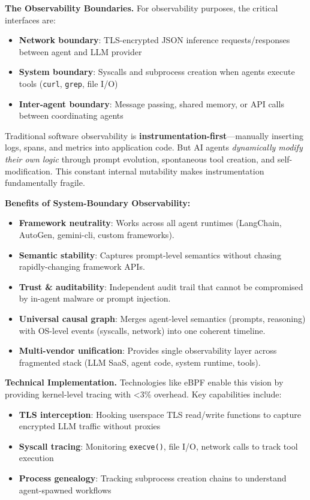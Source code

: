\documentclass[sigplan,screen，review,9pt]{acmart}
\begin{document}
\textbf{The Observability Boundaries.} For observability purposes, the critical interfaces are:
\begin{itemize}
  \item \textbf{Network boundary}: TLS-encrypted JSON inference requests/responses between agent and LLM provider
  \item \textbf{System boundary}: Syscalls and subprocess creation when agents execute tools (\texttt{curl}, \texttt{grep}, file I/O)
  \item \textbf{Inter-agent boundary}: Message passing, shared memory, or API calls between coordinating agents
\end{itemize}

Traditional software observability is \textbf{instrumentation-first}—manually inserting logs, spans, and metrics into application code. But AI agents \emph{dynamically modify their own logic} through prompt evolution, spontaneous tool creation, and self-modification. This constant internal mutability makes instrumentation fundamentally fragile.

\textbf{Benefits of System-Boundary Observability:}
\begin{itemize}
  \item \textbf{Framework neutrality}: Works across all agent runtimes (LangChain, AutoGen, gemini-cli, custom frameworks).
  \item \textbf{Semantic stability}: Captures prompt-level semantics without chasing rapidly-changing framework APIs.
  \item \textbf{Trust \& auditability}: Independent audit trail that cannot be compromised by in-agent malware or prompt injection.
  \item \textbf{Universal causal graph}: Merges agent-level semantics (prompts, reasoning) with OS-level events (syscalls, network) into one coherent timeline.
  \item \textbf{Multi-vendor unification}: Provides single observability layer across fragmented stack (LLM SaaS, agent code, system runtime, tools).
\end{itemize}

\textbf{Technical Implementation.} Technologies like eBPF enable this vision by providing kernel-level tracing with <3\% overhead. Key capabilities include:
\begin{itemize}
  \item \textbf{TLS interception}: Hooking userspace TLS read/write functions to capture encrypted LLM traffic without proxies
  \item \textbf{Syscall tracing}: Monitoring \texttt{execve()}, file I/O, network calls to track tool execution
  \item \textbf{Process genealogy}: Tracking subprocess creation chains to understand agent-spawned workflows
\end{itemize}
\end{document}
